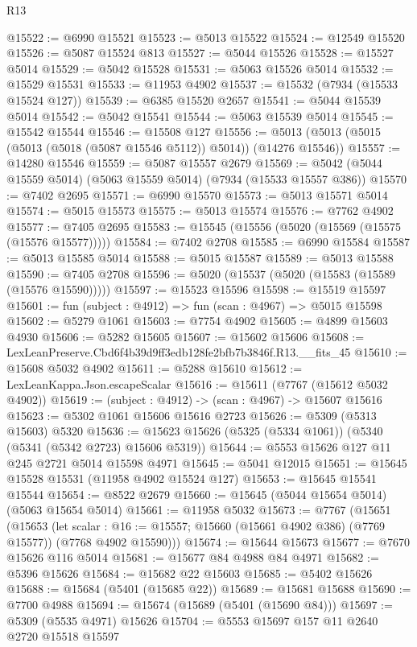 \begin{lexlean}{R13}
\begin{coremodule}
@15522 := @6990 @15521
@15523 := @5013 @15522
@15524 := @12549 @15520
@15526 := @5087 @15524 @813
@15527 := @5044 @15526
@15528 := @15527 @5014
@15529 := @5042 @15528
@15531 := @5063 @15526 @5014
@15532 := @15529 @15531
@15533 := @11953 @4902
@15537 := @15532 (@7934 (@15533 @15524 @127))
@15539 := @6385 @15520 @2657
@15541 := @5044 @15539 @5014
@15542 := @5042 @15541
@15544 := @5063 @15539 @5014
@15545 := @15542 @15544
@15546 := @15508 @127
@15556 := @5013 (@5013 (@5015 (@5013 (@5018 (@5087 @15546 @5112)) @5014)) (@14276 @15546))
@15557 := @14280 @15546
@15559 := @5087 @15557 @2679
@15569 := @5042 (@5044 @15559 @5014) (@5063 @15559 @5014) (@7934 (@15533 @15557 @386))
@15570 := @7402 @2695
@15571 := @6990 @15570
@15573 := @5013 @15571 @5014
@15574 := @5015 @15573
@15575 := @5013 @15574
@15576 := @7762 @4902
@15577 := @7405 @2695
@15583 := @15545 (@15556 (@5020 (@15569 (@15575 (@15576 @15577)))))
@15584 := @7402 @2708
@15585 := @6990 @15584
@15587 := @5013 @15585 @5014
@15588 := @5015 @15587
@15589 := @5013 @15588
@15590 := @7405 @2708
@15596 := @5020 (@15537 (@5020 (@15583 (@15589 (@15576 @15590)))))
@15597 := @15523 @15596
@15598 := @15519 @15597
@15601 := fun (subject : @4912) => fun (scan : @4967) => @5015 @15598
@15602 := @5279 @1061
@15603 := @7754 @4902
@15605 := @4899 @15603 @4930
@15606 := @5282 @15605
@15607 := @15602 @15606
@15608 := LexLeanPreserve.Cbd6f4b39d9ff3edb128fe2bfb7b3846f.R13.__fits_45
@15610 := @15608 @5032 @4902
@15611 := @5288 @15610
@15612 := LexLeanKappa.Json.escapeScalar
@15616 := @15611 (@7767 (@15612 @5032 @4902))
@15619 := (subject : @4912) -> (scan : @4967) -> @15607 @15616
@15623 := @5302 @1061 @15606 @15616 @2723
@15626 := @5309 (@5313 @15603) @5320
@15636 := @15623 @15626 (@5325 (@5334 @1061)) (@5340 (@5341 (@5342 @2723) @15606 @5319))
@15644 := @5553 @15626 @127 @11 @245 @2721 @5014 @15598 @4971
@15645 := @5041 @12015
@15651 := @15645 @15528 @15531 (@11958 @4902 @15524 @127)
@15653 := @15645 @15541 @15544
@15654 := @8522 @2679
@15660 := @15645 (@5044 @15654 @5014) (@5063 @15654 @5014)
@15661 := @11958 @5032
@15673 := @7767
    (@15651
      (@15653
        (let scalar : @16 := @15557; @15660 (@15661 @4902 @386) (@7769 @15577))
        (@7768 @4902 @15590)))
@15674 := @15644 @15673
@15677 := @7670 @15626 @116 @5014
@15681 := @15677 @84 @4988 @84 @4971
@15682 := @5396 @15626
@15684 := @15682 @22 @15603
@15685 := @5402 @15626
@15688 := @15684 (@5401 (@15685 @22))
@15689 := @15681 @15688
@15690 := @7700 @4988
@15694 := @15674 (@15689 (@5401 (@15690 @84)))
@15697 := @5309 (@5535 @4971) @15626
@15704 := @5553 @15697 @157 @11 @2640 @2720 @15518 @15597

\end{coremodule}
\end{lexlean}

